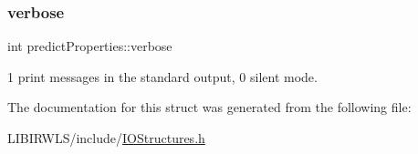 \subsubsection{\texorpdfstring{verbose}{verbose}}
{\ttfamily int predict\+Properties\+::verbose}

1 print messages in the standard output, 0 silent mode. 

The documentation for this struct was generated from the following file\+:\begin{DoxyCompactItemize}
\item 
L\+I\+B\+I\+R\+W\+L\+S/include/\hyperlink{IOStructures_8h}{I\+O\+Structures.\+h}\end{DoxyCompactItemize}
